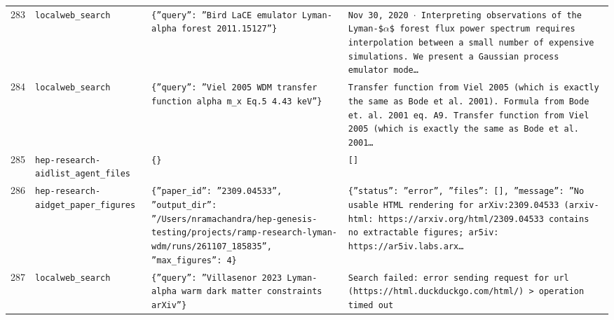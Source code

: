 \documentclass[11pt,a4paper]{article}
\begin{document}
\begin{longtable}{@{}p{}p{}p{}p{}@{}}
283 & \texttt{local}\newline\texttt{web\_\allowbreak{}search} & \texttt{\{''query'':\allowbreak{} ''Bird LaCE emulator Lyman-alpha forest 2011.15127''\}\allowbreak{}} & \texttt{Nov 30,\allowbreak{} 2020 $\cdot$ Interpreting observations of the Lyman-\$$\alpha$\$ forest flux power spectrum requires interpolation between a small number of expensive simulations. We present a Gaussian process emulator mode\ldots{}\allowbreak{}} \\
284 & \texttt{local}\newline\texttt{web\_\allowbreak{}search} & \texttt{\{''query'':\allowbreak{} ''Viel 2005 WDM transfer function alpha m\_\allowbreak{}x Eq.5 4.43 keV''\}\allowbreak{}} & \texttt{Transfer function from Viel 2005 (which is exactly the same as Bode et al. 2001)\allowbreak{}. Formula from Bode et. al. 2001 eq. A9. Transfer function from Viel 2005 (which is exactly the same as Bode et al. 2001\ldots{}\allowbreak{}} \\
285 & \texttt{hep-research-aid}\newline\texttt{list\_\allowbreak{}agent\_\allowbreak{}files} & \texttt{\{\}\allowbreak{}} & \texttt{[]\allowbreak{}} \\
286 & \texttt{hep-research-aid}\newline\texttt{get\_\allowbreak{}paper\_\allowbreak{}figures} & \texttt{\{''paper\_\allowbreak{}id'':\allowbreak{} ''2309.04533'',\allowbreak{} ''output\_\allowbreak{}dir'':\allowbreak{} ''/\allowbreak{}Users/\allowbreak{}nramachandra/\allowbreak{}hep-genesis-testing/\allowbreak{}projects/\allowbreak{}ramp-research-lyman-wdm/\allowbreak{}runs/\allowbreak{}261107\_\allowbreak{}185835'',\allowbreak{} ''max\_\allowbreak{}figures'':\allowbreak{} 4\}\allowbreak{}} & \texttt{\{''status'':\allowbreak{} ''error'',\allowbreak{} ''files'':\allowbreak{} []\allowbreak{},\allowbreak{} ''message'':\allowbreak{} ''No usable HTML rendering for arXiv:\allowbreak{}2309.04533 (arxiv-html:\allowbreak{} https:\allowbreak{}/\allowbreak{}/\allowbreak{}arxiv.org/\allowbreak{}html/\allowbreak{}2309.04533 contains no extractable figures;\allowbreak{} ar5iv:\allowbreak{} https:\allowbreak{}/\allowbreak{}/\allowbreak{}ar5iv.labs.arx\ldots{}\allowbreak{}} \\
287 & \texttt{local}\newline\texttt{web\_\allowbreak{}search} & \texttt{\{''query'':\allowbreak{} ''Villasenor 2023 Lyman-alpha warm dark matter constraints arXiv''\}\allowbreak{}} & \texttt{Search failed:\allowbreak{} error sending request for url (https:\allowbreak{}/\allowbreak{}/\allowbreak{}html.duckduckgo.com/\allowbreak{}html/\allowbreak{})\allowbreak{} \textgreater{}\allowbreak{} operation timed out} \\

\end{longtable}
\end{document}
